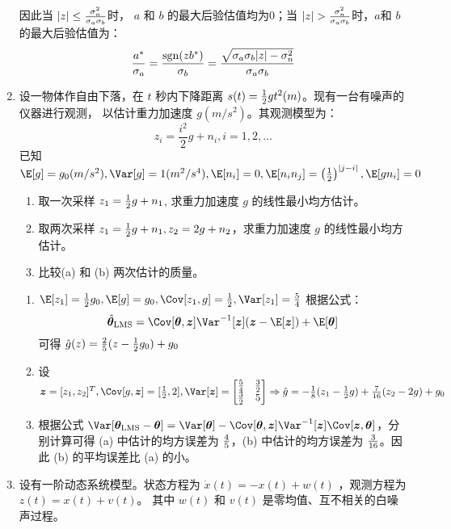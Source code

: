 \documentclass{article}
\DeclarePairedDelimiter\abs{\lvert}{\rvert}
\DeclareMathOperator\sign{\mathrm{sgn}}
\begin{document}
\begin{enumerate}
\begin{solution}
因此当 $\abs{z} \leq {\sigma_n^2 \over \sigma_a \sigma_b } $时， $ a $ 和 $ b $ 的最大后验估值均为0；当
$\abs{z} > {\sigma_n^2 \over \sigma_a \sigma_b } $时，$a$和 $b$的最大后验估值为：
$$
{ a^* \over \sigma_a } = { \sign(z b^*) \over \sigma_b } = {\sqrt{\sigma_a \sigma_b \abs{z} - \sigma_n^2} \over \sigma_a \sigma_b}
$$


\end{solution}
\item 设一物体作自由下落，在 $ t $ 秒内下降距离 $ s(t) = { 1 \over 2} g t^2 (m)$。现有一台有噪声的仪器进行观测，
以估计重力加速度 $ g (m/s^2) $。其观测模型为：
$$
 z_i = \frac{ i^2}{2} g + n_i , i = 1, 2, \dots
$$
已知 $ \E[g] = g_0 (m/s^2), \Var[g] = 1 (m^2/s^4), \E[n_i] =0, \E[n_i n_j] = \left({1 \over 2}\right)^{\abs{j-i}}, \E[g n_i]=0 $
\begin{enumerate}
\item 取一次采样 $ z_1 = { 1 \over 2} g + n_1 $, 求重力加速度 $ g $ 的线性最小均方估计。
\item 取两次采样 $ z_1 = { 1 \over 2} g + n_1, z_2 = 2g + n_2 $，求重力加速度 $ g $ 的线性最小均方估计。
\item 比较(a) 和 (b) 两次估计的质量。
\end{enumerate}
\begin{solution}
\begin{enumerate}
\item $ \E[z_1] = { 1 \over 2} g_0, \E[ g ] = g_0, \Cov[z_1, g] = { 1 \over 2}, \Var[z_1] = { 5 \over 4 }  $
根据公式：$$ \hat{\bm{\theta}}_{\textrm{LMS}}=\Cov[\bm{\theta},\bm{z}]\Var^{-1}[\bm{z}](\bm{z}-\E[\bm{z}])+\E[\bm{\theta}] $$
可得 $ \hat{g} (z) = { 2 \over 5 } ( z - {1 \over 2} g_0 ) + g_0 $
\item 设 $ \bm{z} = [z_1, z_2]^T, \Cov[g,\bm{z}] = [{ 1 \over 2}, 2], \Var[\bm{z}] = \begin{bmatrix} { 5 \over 4} & { 3 \over 2} \\ {3 \over 2} & 5
\end{bmatrix} \Rightarrow \hat{g} = -{ 1 \over 8} ( z_1 - { 1 \over 2} g ) + {7 \over 16} ( z_2 - 2 g) + g_0$
\item 根据公式 $\Var[\bm{\theta}_{\textrm{LMS}}-\bm{\theta}]  = \Var[\bm{\theta}] - \Cov[\bm{\theta},\bm{z}]\Var^{-1}[\bm{z}]\Cov[\bm{z},\bm{\theta}]$，分别计算可得 (a) 中估计的均方误差为 $ { 4 \over 5 } $，(b) 中估计的均方误差为 $ { 3 \over 16 } $。因此 (b) 的平均误差比
(a) 的小。
\end{enumerate}
\end{solution}
\item 设有一阶动态系统模型。状态方程为 $ \dot x(t) = -x(t) + w(t) $ ，观测方程为  $ z(t) = x(t) + v(t) $。 其中 $ w(t) $  和 $ v(t) $ 是零均值、互不相关的白噪声过程。

\end{enumerate}
\end{document}
